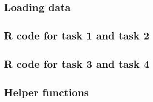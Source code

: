 \subsection{Loading data}\label{app:code-loaddata}


\subsection{R code for task 1 and task 2}\label{app:code-task1}


\subsection{R code for task 3 and task 4}\label{app:code-task3}


\subsection{Helper functions}\label{app:code-helpers}


\pagebreak





